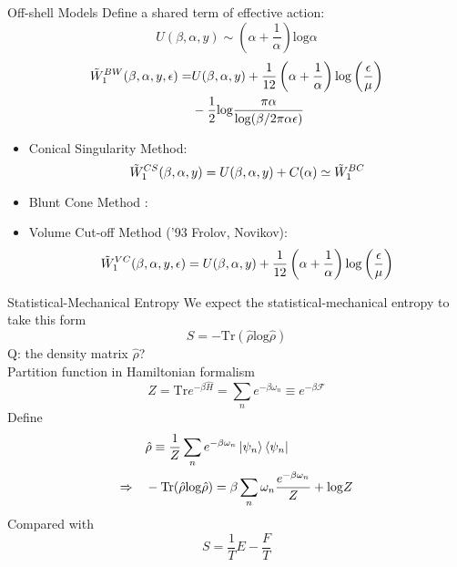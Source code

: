 \documentclass{beamer}
\begin{document}
\begin{frame}{Off-shell Models}
    Define a shared term of effective action: $$U(\beta,\alpha,y)\sim(\alpha+\frac{1}{\alpha})\mathrm{log}\alpha$$
    \begin{equation*}
        \begin{split}
            \Tilde{W}_1^{BW}(\beta,\alpha,y,\epsilon)=&U(\beta,\alpha,y)+\frac{1}{12}\left(\alpha+\frac{1}{\alpha}\right)\mathrm{log}\left(\frac{\epsilon}{\mu}\right)\\
            &-\frac{1}{2}\mathrm{log}\frac{\pi\alpha}{\mathrm{log}(\beta/2\pi\alpha\epsilon)}
        \end{split}
    \end{equation*}
    \begin{itemize}
        \item Conical Singularity Method{\color{blue}{ ('94 Susskind, Uglum)}}:
        \begin{equation*}
            \Tilde{W}_1^{CS}(\beta,\alpha,y)=U(\beta,\alpha,y)+C(\alpha)\simeq \Tilde{W}_1^{BC}
        \end{equation*}
        \item Blunt Cone Method {\color{blue}{('95 Solodukhin)}}:
        \item Volume Cut-off Method{\color{blue} ('93 Frolov, Novikov)}:
        \begin{equation*}
            \Tilde{W}_1^{VC}(\beta,\alpha,y,\epsilon)=U(\beta,\alpha,y)+\frac{1}{12}\left(\alpha+\frac{1}{\alpha}\right)\mathrm{log}\left(\frac{\epsilon}{\mu}\right)
        \end{equation*}
    \end{itemize}
\end{frame}

\begin{frame}{Statistical-Mechanical Entropy}
    We expect the statistical-mechanical entropy to take this form
    \begin{equation*}
        S=-\mathrm{Tr}(\hat{\rho}\mathrm{log}\hat{\rho})
    \end{equation*}
    Q: the density matrix $\hat{\rho}$?\\
    Partition function in Hamiltonian formalism
    \begin{equation*}
        Z=\mathrm{Tr}e^{-\beta\hat{H}}=\sum_n e^{-\beta\omega_n}\equiv e^{-\beta\mathcal{F}}
    \end{equation*}
    Define 
    \begin{equation*}
    \begin{split}
        &\hat{\rho}\equiv \frac{1}{Z}\sum_n e^{-\beta\omega_n}\ket{\psi_n}\bra{\psi_n}\\
        \Rightarrow\quad &-\mathrm{Tr}(\hat{\rho}\mathrm{log}\hat{\rho})=\beta\sum_n\omega_n\frac{e^{-\beta\omega_n}}{Z}+\mathrm{log}Z
    \end{split}
    \end{equation*}
    Compared with $$S=\frac{1}{T}E-\frac{F}{T}$$
\end{frame}
\end{document}
